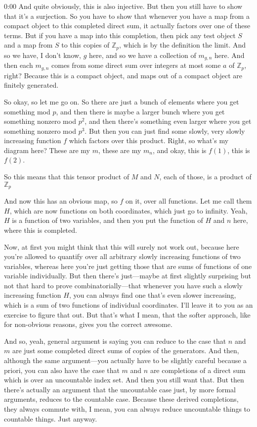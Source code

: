 \begin{unfinished}{0:00}
And quite obviously, this is also injective. But then you still have to show that it's a surjection. So you have to show that whenever you have a map from a compact object to this completed direct sum, it actually factors over one of these terms. But if you have a map into this completion, then pick any test object $S$ and a map from $S$ to this copies of $\mathbb{Z}_p$, which is by the definition the limit. And so we have, I don't know, $g$ here, and so we have a collection of $m_{g,n}$ here. And then each $m_{g,n}$ comes from some direct sum over integers at most some $a$ of $\mathbb{Z}_p$, right? Because this is a compact object, and maps out of a compact object are finitely generated.

So okay, so let me go on. So there are just a bunch of elements where you get something mod $p$, and then there is maybe a larger bunch where you get something nonzero mod $p^2$, and then there's something even larger where you get something nonzero mod $p^3$. But then you can just find some slowly, very slowly increasing function $f$ which factors over this product. Right, so what's my diagram here? These are my $m$, these are my $m_n$, and okay, this is $f(1)$, this is $f(2)$.

So this means that this tensor product of $M$ and $N$, each of those, is a product of $\mathbb{Z}_p$

And now this has an obvious map, so $f$ on it, over all functions. Let me call them $H$, which are now functions on both coordinates, which just go to infinity. Yeah, $H$ is a function of two variables, and then you put the function of $H$ and $n$ here, where this is completed.

Now, at first you might think that this will surely not work out, because here you're allowed to quantify over all arbitrary slowly increasing functions of two variables, whereas here you're just getting those that are sums of functions of one variable individually. But then there's just---maybe at first slightly surprising but not that hard to prove combinatorially---that whenever you have such a slowly increasing function $H$, you can always find one that's even slower increasing, which is a sum of two functions of individual coordinates. I'll leave it to you as an exercise to figure that out. But that's what I mean, that the softer approach, like for non-obvious reasons, gives you the correct awesome.

And so, yeah, general argument is saying you can reduce to the case that $n$ and $m$ are just some completed direct sums of copies of the generators. And then, although the same argument---you actually have to be slightly careful because a priori, you can also have the case that $m$ and $n$ are completions of a direct sum which is over an uncountable index set. And then you still want that. But then there's actually an argument that the uncountable case just, by more formal arguments, reduces to the countable case. Because these derived completions, they always commute with, I mean, you can always reduce uncountable things to countable things. Just anyway.


\end{unfinished}
